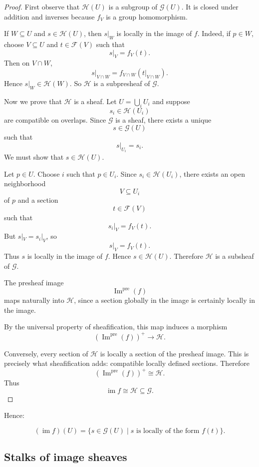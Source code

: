\documentclass[12pt,a4paper]{article}
\newcommand{\im}{\operatorname{im}}
\begin{document}
\begin{proof}
	First observe that $\mathcal H(U)$ is a subgroup of $\mathcal G(U)$.
	It is closed under addition and inverses because $f_V$ is a group homomorphism.
	
	If $W \subseteq U$ and $s \in \mathcal H(U)$, then $s|_W$ is locally in the
	image of $f$.
	Indeed, if $p \in W$, choose $V \subseteq U$ and $t \in \mathcal F(V)$ such
	that
	\[
	s|_V=f_V(t).
	\]
	Then on $V \cap W$,
	\[
	s|_{V \cap W}
	=
	f_{V \cap W}(t|_{V \cap W}).
	\]
	Hence $s|_W \in \mathcal H(W)$.
	So $\mathcal H$ is a subpresheaf of $\mathcal G$.
	
	Now we prove that $\mathcal H$ is a sheaf.
	Let $U=\bigcup_i U_i$ and suppose
	\[
	s_i \in \mathcal H(U_i)
	\]
	are compatible on overlaps.
	Since $\mathcal G$ is a sheaf, there exists a unique
	\[
	s \in \mathcal G(U)
	\]
	such that
	\[
	s|_{U_i}=s_i.
	\]
	We must show that $s \in \mathcal H(U)$.
	
	Let $p \in U$.
	Choose $i$ such that $p \in U_i$.
	Since $s_i \in \mathcal H(U_i)$, there exists an open neighborhood
	\[
	V \subseteq U_i
	\]
	of $p$ and a section
	\[
	t \in \mathcal F(V)
	\]
	such that
	\[
	s_i|_V=f_V(t).
	\]
	But $s|_V=s_i|_V$, so
	\[
	s|_V=f_V(t).
	\]
	Thus $s$ is locally in the image of $f$.
	Hence $s \in \mathcal H(U)$.
	Therefore $\mathcal H$ is a subsheaf of $\mathcal G$.
	
	The presheaf image
	\[
	\operatorname{Im}^{\operatorname{pre}}(f)
	\]
	maps naturally into $\mathcal H$, since a section globally in the image is
	certainly locally in the image.
	
	By the universal property of sheafification, this map induces a morphism
	\[
	\left(
	\operatorname{Im}^{\operatorname{pre}}(f)
	\right)^+
	\longrightarrow
	\mathcal H.
	\]
	
	Conversely, every section of $\mathcal H$ is locally a section of the presheaf
	image. This is precisely what sheafification adds: compatible locally defined
	sections.
	Therefore
	\[
	\left(
	\operatorname{Im}^{\operatorname{pre}}(f)
	\right)^+
	\cong
	\mathcal H.
	\]
	Thus
	\[
	\im f \cong \mathcal H \subseteq \mathcal G.
	\]
\end{proof}

Hence:

\[
\boxed{
	(\im f)(U)
	=
	\{s \in \mathcal G(U)
	\mid
	s \text{ is locally of the form } f(t)\}.
}
\]

\subsection{Stalks of image sheaves}
\end{document}
